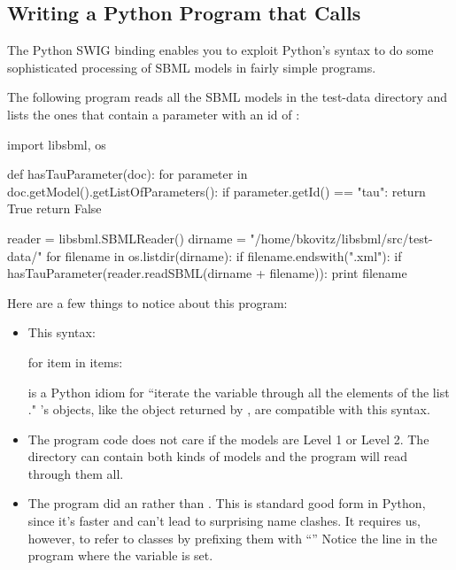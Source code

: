 \documentclass{sbmlmanual}
\begin{document}
\subsection{Writing a Python Program that Calls \libsbml{}}
\label{sec:python-calling-libsbml}

The Python SWIG binding enables you to exploit Python's
syntax to do some sophisticated processing of SBML models in
fairly simple programs.

The following program reads all the SBML models in the
test-data directory and lists the ones that contain a
parameter with an id of :

\begin{boxedCodeVerbatim}
import libsbml, os

def hasTauParameter(doc):
   for parameter in doc.getModel().getListOfParameters():
      if parameter.getId() == "tau":
         return True
   return False

reader = libsbml.SBMLReader()
dirname = "/home/bkovitz/libsbml/src/test-data/"
for filename in os.listdir(dirname):
   if filename.endswith(".xml"):
      if hasTauParameter(reader.readSBML(dirname + filename)):
         print filename
\end{boxedCodeVerbatim}

Here are a few things to notice about this program:

\begin{itemize}

\item
This syntax:

\begin{pythonVerbatim}
for item in items:
\end{pythonVerbatim}

is a Python idiom for ``iterate the variable  through
all the elements of the list ."  \libsbml{}'s 
objects, like the object returned by
, are compatible with this
syntax.

\item
The program code does not care if the models are Level 1 or Level 2.  The
directory can contain both kinds of models and the program will read through
them all.

\item
The program did an  rather than
.  This is standard good form in Python, since
it's faster and can't lead to surprising name clashes.  It requires us,
however, to refer to \libsbml{} classes by prefixing them with
``''  Notice the line in the program where the variable
 is set.

\end{itemize}
\end{document}
